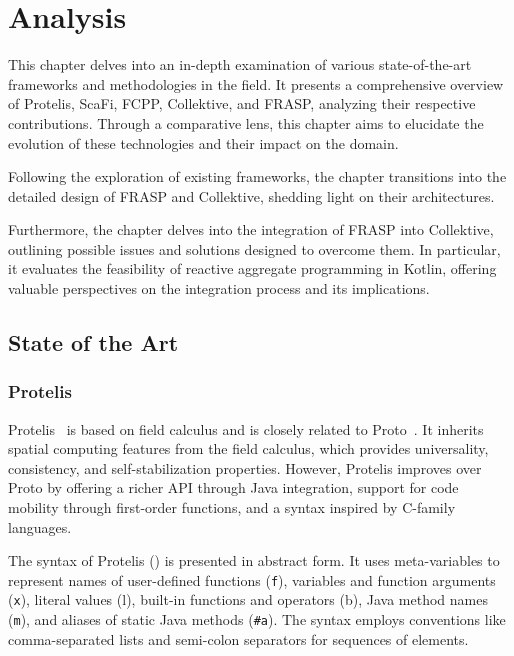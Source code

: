 
\chapter{Analysis}
\label{chap:analysis}

This chapter delves into an in-depth examination of various state-of-the-art frameworks and methodologies in the field. It presents a comprehensive overview of Protelis, ScaFi, FCPP, Collektive, and FRASP, analyzing their respective contributions. Through a comparative lens, this chapter aims to elucidate the evolution of these technologies and their impact on the domain.

Following the exploration of existing frameworks, the chapter transitions into the detailed design of FRASP and Collektive, shedding light on their architectures.

Furthermore, the chapter delves into the integration of FRASP into Collektive, outlining possible issues and solutions designed to overcome them. In particular, it evaluates the feasibility of reactive aggregate programming in Kotlin, offering valuable perspectives on the integration process and its implications.

\section{State of the Art}

\subsection{Protelis}

Protelis~\cite{Pianini2015} is based on field calculus and is closely related to Proto~\cite{Beal2006}. It inherits spatial computing features from the field calculus, which provides universality, consistency, and self-stabilization properties. However, Protelis improves over Proto by offering a richer API through Java integration, support for code mobility through first-order functions, and a syntax inspired by C-family languages.

The syntax of Protelis () is presented in abstract form. It uses meta-variables to represent names of user-defined functions (\texttt{f}), variables and function arguments (\texttt{x}), literal values (l), built-in functions and operators (b), Java method names (\texttt{m}), and aliases of static Java methods (\texttt{\#a}). The syntax employs conventions like comma-separated lists and semi-colon separators for sequences of elements.

